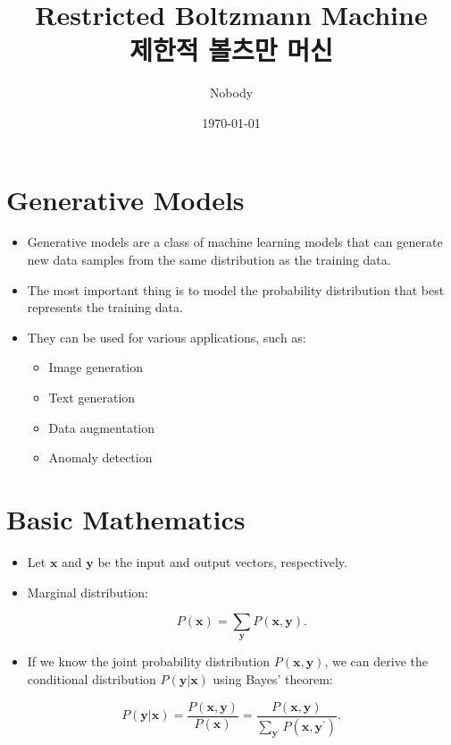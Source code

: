 \documentclass[10pt, a4paper]{article}
\title{\textbf{Restricted Boltzmann Machine}\\[0.5em]
       \large 제한적 볼츠만 머신}
\author{Nobody}
\date{\today}
\begin{document}

\maketitle
\tableofcontents
\newpage

\section{Generative Models}
\begin{itemize}
  \item Generative models are a class of machine learning models that can generate
        new data samples from the same distribution as the training data.
  \item The most important thing is to model the probability distribution
        that best represents the training data.
  \item They can be used for various applications, such as:
        \begin{itemize}
          \item Image generation
          \item Text generation
          \item Data augmentation
          \item Anomaly detection
        \end{itemize}
\end{itemize}

\section{Basic Mathematics}
\begin{itemize}
  \item Let $\mathbf{x}$ and $\mathbf{y}$ be the input and output vectors, respectively.
  \item Marginal distribution:
    \begin{derivbox}[Marginalization]
      \begin{equation}
        \label{eq:marginal}
        P(\mathbf{x}) = \sum_{\mathbf{y}} P(\mathbf{x}, \mathbf{y}).
      \end{equation}
    \end{derivbox}
  \item If we know the joint probability distribution $P(\mathbf{x}, \mathbf{y})$,
      we can derive the conditional distribution $P(\mathbf{y}|\mathbf{x})$
      using Bayes' theorem:
\end{itemize}
\begin{derivbox}
  \begin{equation}
    \label{eq:bayes}
    P(\mathbf{y}|\mathbf{x}) = \frac{P(\mathbf{x}, \mathbf{y})}{P(\mathbf{x})}
                             = \frac{P(\mathbf{x}, \mathbf{y})}{\sum_{\mathbf{y^\prime}}P(\mathbf{x},\mathbf{y^\prime})}.
  \end{equation}
\end{derivbox}
\end{document}
